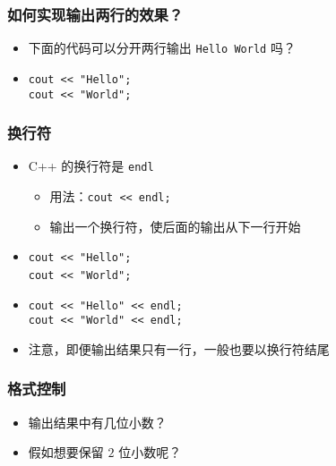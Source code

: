 \begin{frame}[fragile]
    \frametitle{如何实现输出两行的效果？}

    \begin{itemize}
        \item 下面的代码可以分开两行输出 \lstinline|Hello World| 吗？

        \item
            \lstinline|cout << "Hello";|\\ 
            \lstinline|cout << "World";|
    \end{itemize}
\end{frame}

\begin{frame}[fragile]
    \frametitle{换行符}

    \begin{itemize}
        \item<1-> C++ 的换行符是 \lstinline|endl|

            \begin{itemize}
                \item 用法：\lstinline|cout << endl;|
                \item 输出一个换行符，使后面的输出从下一行开始
            \end{itemize}

        \item<2->
             {
                \lstinline|cout << "Hello";|\\ 
                \lstinline|cout << "World";|
            }{
                \\ 
            }

        \item<3->
            \lstinline|cout << "Hello" << endl;|\\ 
            \lstinline|cout << "World" << endl;|

        \item<4-> 注意，即便输出结果只有一行，一般也要以换行符结尾
    \end{itemize}
\end{frame}

\begin{frame}[fragile]
    \frametitle{格式控制}

    

    \begin{itemize}
        \item<2-> 输出结果中有几位小数？
        \item<2-> 假如想要保留 $2$ 位小数呢？
    \end{itemize}
\end{frame}

